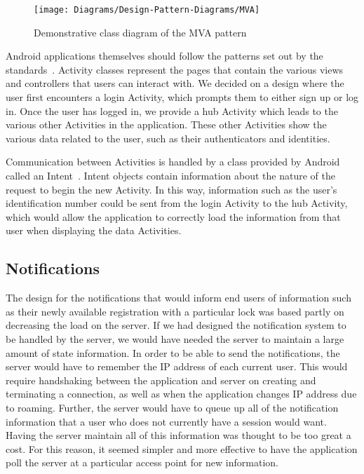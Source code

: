 \documentclass[12pt]{report}
\let\Oldsubsection\subsection
\renewcommand{\subsection}{\FloatBarrier\Oldsubsection}
\begin{document}
\begin{figure}
    \centering
    \texttt{[image: Diagrams/Design-Pattern-Diagrams/MVA]}
    \caption{Demonstrative class diagram of the MVA pattern}
    \label{fig:MVA}
\end{figure}

Android applications themselves should follow the patterns set out by the standards~\autocite{ANDROIDSTANDARD}. Activity classes represent the
pages that contain the various views and controllers that users can interact with. We decided on a design where the user
first encounters a login Activity, which prompts them to either sign up or log in. Once the user has logged in, we
provide a hub Activity which leads to the various other Activities in the application. These other Activities show the
various data related to the user, such as their authenticators and identities.

Communication between Activities is handled by a class provided by Android called an Intent~\autocite{ANDROIDINTENT}. Intent objects contain
information about the nature of the request to begin the new Activity. In this way, information such as the user's
identification number could be sent from the login Activity to the hub Activity, which would allow the application to
correctly load the information from that user when displaying the data Activities.


\subsection{Notifications} \label{notifications}


The design for the notifications that would inform end users of information such as their newly available registration
with a particular lock was based partly on decreasing the load on the server. If we had designed the notification system to
be handled by the server, we would have needed the server to maintain a large amount of state information. In order to
be able to send the notifications, the server would have to remember the IP address of each current user. This would
require handshaking between the application and server on creating and terminating a connection, as well as when the
application changes IP address due to roaming. Further, the server would have to queue up all of the notification
information that a user who does not currently have a session would want. Having the server maintain all of this
information was thought to be too great a cost. For this reason, it seemed simpler and more effective to have the
application poll the server at a particular access point for new information.
\end{document}
